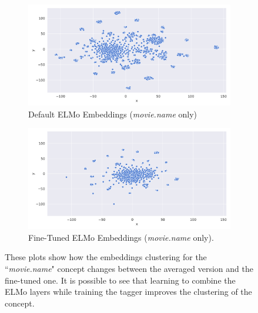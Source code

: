 \documentclass[11pt,a4paper]{article}
\begin{document}
\begin{figure}[t]
\begin{subfigure}{0.5\linewidth}
  \centering
  \includegraphics[width=\linewidth]{img/elmo-embeddings-not-trained-2D.png}
  \caption{Default ELMo Embeddings (\textit{movie.name} only)}
  \label{fig:sfig1}
\end{subfigure}%
\begin{subfigure}{0.5\linewidth}
  \centering
  \includegraphics[width=\linewidth]{img/elmo-embeddings-trained-2D.png}
  \caption{Fine-Tuned ELMo Embeddings (\textit{movie.name} only).}
  \label{fig:sfig2}
\end{subfigure}%
\caption{These plots show how the embeddings clustering for the ``\textit{movie.name}" concept changes between the averaged version and the fine-tuned one. It is possible to see that learning to combine the ELMo layers while training the tagger improves the clustering of the concept.}
\label{fig:fine-tuned-emb}
\end{figure}
\end{document}
